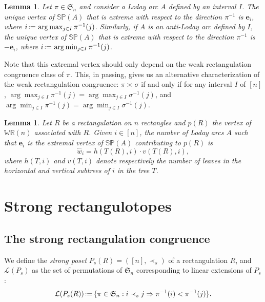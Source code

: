\documentclass{amsart}
\newtheorem{lemma}[theorem]{Lemma}
\theoremstyle{definition}
\newcommand{\f}[1]{\mathfrak{#1}} %
\newcommand{\eqdef}{\mbox{\,\raisebox{0.2ex}{\scriptsize\ensuremath{\mathrm:}}\ensuremath{=}\,}} %
\renewcommand{\implies}{\Rightarrow} %
\newcommand{\darkblue}{\color{darkblue}} %
\newcommand{\defn}[1]{\textsl{\darkblue #1}} %
\newcommand{\polytope}[1]{\mathds{#1}} %
\newcommand{\WRP}{\polytope{WR}} %
\newcommand{\SP}{\polytope{SP}}
\newcommand{\loday}[1]{\overset{\frown}{#1}}
\newcommand{\baxtereq}{\asymp}%
\begin{document}
\begin{lemma}
  \label{lem:lodaymax}
  Let $\pi\in\f{S}_n$ and consider a Loday arc $A$ defined by an interval $I$.
  The unique vertex of $\SP(A)$ that is extreme with respect to the direction $\pi^{-1}$
  is $\mathbf{e}_i$, where $i \eqdef \arg\max_{j\in I} \pi^{-1}(j)$.
  Similarly, if $A$ is an anti-Loday arc defined by $I$, the unique vertex of $\SP(A)$ that is extreme with respect to the direction $\pi^{-1}$
  is $-\mathbf{e}_i$, where $i \eqdef \arg\min_{j\in I} \pi^{-1}(j)$.
\end{lemma}

Note that this extremal vertex should only depend on the weak rectangulation congruence class of $\pi$.
This, in passing, gives us an alternative characterization of the weak rectangulation congruence:
$\pi\baxtereq\sigma$ if and only if for any interval $I$ of $[n]$,
$\arg\max_{j\in I} \pi^{-1}(j)=\arg\max_{j\in I} \sigma^{-1}(j)$, and
$\arg\min_{j\in I} \pi^{-1}(j)=\arg\min_{j\in I} \sigma^{-1}(j)$.

\begin{lemma}
  Let $R$ be a rectangulation on $n$ rectangles and $p(R)$ the vertex of $\WRP(n)$ associated with $R$.
  Given $i\in [n]$, the number of Loday arcs $A$ such that $\mathbf{e}_i$ is the extremal vertex of $\SP(A)$ contributing to $p(R)$ is
  \[
  \loday{w}_i =  h(T(R), i)\cdot v(T(R),i),
  \]
   where $h(T,i)$ and $v(T,i)$ denote respectively the number of leaves in the horizontal and vertical subtrees of $i$ in the tree $T$.
\end{lemma}


\section{Strong rectangulotopes}
\label{sec:sr}

\subsection{The strong rectangulation congruence}

We define the \defn{strong poset} $P_s(R)=([n],\prec_s)$ of a rectangulation $R$, and $\mathcal{L}(P_s)$ as the set of permutations of $\f{S}_n$ corresponding to linear extensions of $P_s$:
\[
\mathcal{L}(P_s(R)) \eqdef \{\pi\in\f{S}_n : i\prec_s j\implies \pi^{-1}(i) < \pi^{-1}(j)\}.
\]
\end{document}
